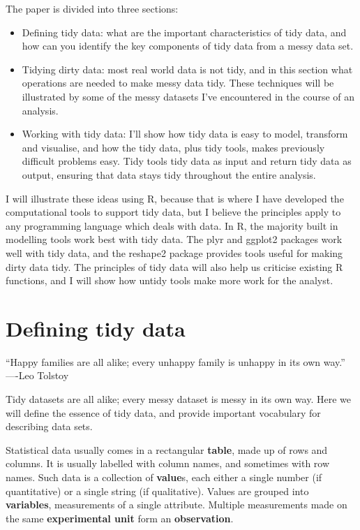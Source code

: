 \documentclass[oneside]{article}
\begin{document}
The paper is divided into three sections:

\begin{itemize}

\item Defining tidy data: what are the important characteristics of tidy data, and how can you identify the key components of tidy data from a messy data set.

\item Tidying dirty data: most real world data is not tidy, and in this section what operations are needed to make messy data tidy. These techniques will be illustrated by some of the messy datasets I've encountered in the course of an analysis.

\item Working with tidy data: I'll show how tidy data is easy to model, transform and visualise, and how the tidy data, plus tidy tools, makes previously difficult problems easy. Tidy tools tidy data as input and return tidy data as output, ensuring that data stays tidy throughout the entire analysis.

\end{itemize}

I will illustrate these ideas using R, because that is where I have developed the computational tools to support tidy data, but I believe the principles apply to any programming language which deals with data. In R, the majority built in modelling tools work best with tidy data. The plyr and ggplot2 \citep{me:ggplot2} packages work well with tidy data, and the reshape2 package provides tools useful for making dirty data tidy. The principles of tidy data will also help us criticise existing R functions, and I will show how untidy tools make more work for the analyst.

\section{Defining tidy data}

``Happy families are all alike; every unhappy family is unhappy in its own way.'' ----Leo Tolstoy

Tidy datasets are all alike; every messy dataset is messy in its own way. Here we will define the essence of tidy data, and provide important vocabulary for describing data sets.

Statistical data usually comes in a rectangular \textbf{table}, made up of rows and columns. It is usually labelled with column names, and sometimes with row names. Such data is a collection of \textbf{value}s, each either a single number (if quantitative) or a single string (if qualitative). Values are grouped into \textbf{variables}, measurements of a single attribute. Multiple measurements made on the same \textbf{experimental unit} form an \textbf{observation}. 
\end{document}
